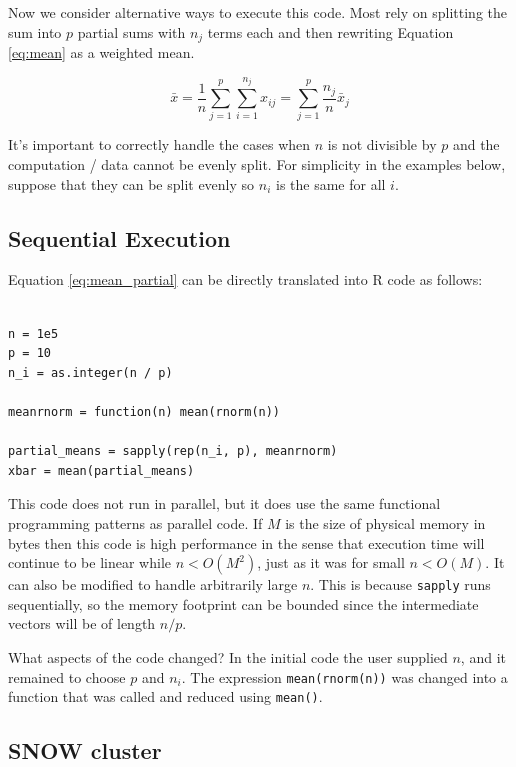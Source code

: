 \documentclass[12pt]{article}
\begin{document}
Now we consider alternative ways to execute this code.  Most rely on
splitting the sum into $p$ partial sums with $n_j$ terms each and then rewriting
Equation \ref{eq:mean} as a weighted mean.

\begin{equation}
    \bar{x} = \frac{1}{n} \sum_{j = 1}^p \sum_{i = 1}^{n_j} x_{ij}
    = \sum_{j = 1}^p \frac{n_j}{n} \bar{x}_j
\label{eq:mean_partial}
\end{equation}

It's important to correctly handle the cases when $n$ is not divisible by $p$
and the computation / data cannot be evenly split. For simplicity in the
examples below, suppose that they can be split evenly so $n_i$ is the same
for all $i$.

\subsection{Sequential Execution}
\label{section:sequential}

Equation \ref{eq:mean_partial} can be directly translated into R code as
follows:

\begin{verbatim}

n = 1e5
p = 10
n_i = as.integer(n / p)

meanrnorm = function(n) mean(rnorm(n))

partial_means = sapply(rep(n_i, p), meanrnorm)
xbar = mean(partial_means)
\end{verbatim}

This code does not run in parallel, but it does use the same functional
programming patterns as parallel code. If $M$ is the size of physical memory in
bytes then this code is high performance in the sense
that execution time will continue to be linear while $n < O(M^2)$, just
as it was for small $n < O(M)$. It can also be modified to handle
arbitrarily large $n$. This is because \texttt{sapply} runs
sequentially, so the memory footprint can be bounded since the intermediate
vectors will be of length $n / p$. 

What aspects of the code changed? In the initial code the user
supplied $n$, and it remained to choose $p$ and $n_i$.
The expression \texttt{mean(rnorm(n))} was changed into a function that was
called and reduced using \texttt{mean()}.

\subsection{SNOW cluster}
\end{document}
